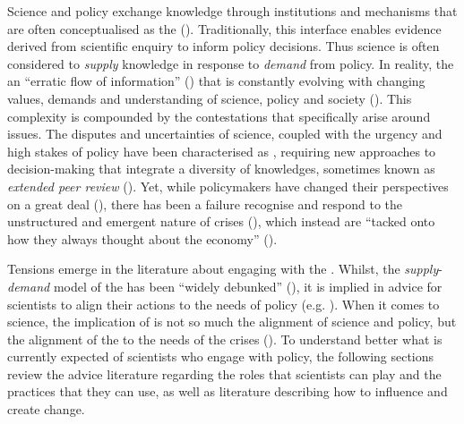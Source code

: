 Science and policy exchange knowledge through institutions and mechanisms that are often conceptualised as the \SPI{} (\cite{JagannathanEtAl2023}). 
Traditionally, this interface enables %
evidence derived from scientific enquiry to inform policy decisions. Thus science is often considered to \emph{supply} knowledge in response to \emph{demand} from policy. 
In reality, the \SPI{} an ``erratic flow of information'' (\cite{BednarekSHG2015}) that is constantly evolving with changing values, demands and understanding of science, policy and society (\cite{BoswellS2017,Cairney2018,Obermeister2020}). 
This complexity is compounded by the contestations that specifically arise around \CAN{} issues.  
The disputes and uncertainties of \CAN{} science, coupled with the urgency and high stakes of \CAN{} policy have been characterised as \PNS, requiring new approaches to decision-making that integrate a diversity of knowledges, sometimes known as \emph{extended peer review} (\cite{FuntowiczR1993,Ravetz1999,Jasanoff2003,Hewitt2024}). 
Yet, while policymakers have changed their perspectives on \CAN{} a great deal (\cite[p118]{Killick2023}), there has been a failure recognise and respond to the unstructured and emergent nature of \CAN{} crises (\cite{FuntowiczR1993,WesselinkH2020}), which instead are ``tacked onto how they always thought about the economy'' (\cite[p118]{Killick2023}). 

Tensions emerge in the literature about engaging with the \CAN{} \SPI. Whilst, the \emph{supply}-\emph{demand} model of the \SPI{} has been ``widely debunked'' (\cite{BoswellS2017}), it is implied in advice for scientists to align their actions to the needs of policy (e.g. \cite{McNie2007,GeddesDP2018,BlessenohlS2022,Bisbal2024}). When it comes to \CAN{} science, the implication of \PNS{} is not so much the alignment of science and policy, but the alignment of the \SPI{} to the needs of the \CAN{} crises (\cite{BalvaneraJNOBCDGGKKMPSSW2020}). To understand better what is currently expected of scientists who engage with policy, the following sections review the advice literature regarding the roles that scientists can play and the practices that they can use, as well as literature describing how to influence and create change.

